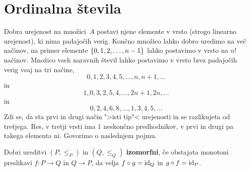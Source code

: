 \section{Ordinalna števila}
\label{sec:ordinalna-tevila}

Dobra urejenost na množici~$A$ postavi njene elemente v vrsto (strogo linearno urejenost), ki nima padajočih verig.
Končno množico lahko dobro uredimo na več načinov, na primer elemente $\set{0, 1, 2, \ldots, n-1}$ lahko postavimo v vrsto na $n!$ načinov. Množico vseh naravnih števil lahko postavimo v vrsto brez padajočih verig vsaj na tri načine,
%
\begin{equation*}
  0, 1, 2, 3, 4, 5, \ldots, n, n + 1, \ldots
\end{equation*}
%
in
%
\begin{equation*}
  1, 0, 3, 2, 5, 4, \ldots, 2 n + 1, 2 n, \ldots
\end{equation*}
%
in
%
\begin{equation*}
  0, 2, 4, 6, 8, \ldots, 1, 3, 4, 5, \ldots
\end{equation*}
%
Zdi se, da sta prvi in drugi način ">isti tip"< urejenosti in se razlikujeta od tretjega. Res, v tretji vrsti ima $1$ neskončno predhodnikov, v prvi in drugi pa takega elementa ni. Govorimo o naslednjem pojmu.

\begin{definicija}
  Dobri ureditvi $(P, {\leq_P})$ in $(Q, {\leq_Q})$ \textbf{izomorfni}, če obstajata monotoni preslikavi $f : P \to Q$ in $Q \to P$, da velja $f \circ g = \id[Q]$ in $g \circ f = \id[P]$.
\end{definicija}

